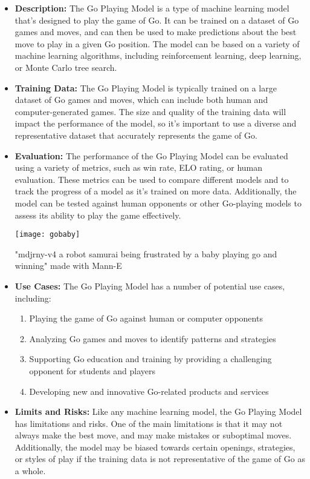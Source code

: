 \begin{itemize}
    \item \textbf{Description:} The Go Playing Model is a type of machine learning model that's designed to play the game of Go. It can be trained on a dataset of Go games and moves, and can then be used to make predictions about the best move to play in a given Go position. The model can be based on a variety of machine learning algorithms, including reinforcement learning, deep learning, or Monte Carlo tree search.
    \item \textbf{Training Data:} The Go Playing Model is typically trained on a large dataset of Go games and moves, which can include both human and computer-generated games. The size and quality of the training data will impact the performance of the model, so it's important to use a diverse and representative dataset that accurately represents the game of Go.
    \item \textbf{Evaluation:} The performance of the Go Playing Model can be evaluated using a variety of metrics, such as win rate, ELO rating, or human evaluation. These metrics can be used to compare different models and to track the progress of a model as it's trained on more data. Additionally, the model can be tested against human opponents or other Go-playing models to assess its ability to play the game effectively.
\begin{marginfigure}[-5.5cm]
        \texttt{[image: gobaby]}
        \caption{"mdjrny-v4 a robot samurai being frustrated by a baby playing go and winning" made with Mann-E}
\end{marginfigure}
    \item \textbf{Use Cases:} The Go Playing Model has a number of potential use cases, including:
        \begin{enumerate}  
            \item Playing the game of Go against human or computer opponents
            \item Analyzing Go games and moves to identify patterns and strategies
            \item Supporting Go education and training by providing a challenging opponent for students and players
            \item Developing new and innovative Go-related products and services
        \end{enumerate}
    \item \textbf{Limits and Risks:} Like any machine learning model, the Go Playing Model has limitations and risks. One of the main limitations is that it may not always make the best move, and may make mistakes or suboptimal moves. Additionally, the model may be biased towards certain openings, strategies, or styles of play if the training data is not representative of the game of Go as a whole.

\end{itemize}
